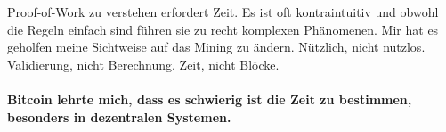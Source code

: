 Proof-of-Work zu verstehen erfordert Zeit. Es ist oft kontraintuitiv und obwohl
die Regeln einfach sind führen sie zu recht komplexen Phänomenen. Mir hat es
geholfen meine Sichtweise auf das Mining zu ändern. Nützlich, nicht nutzlos.
Validierung, nicht Berechnung. Zeit, nicht Blöcke.

\paragraph{Bitcoin lehrte mich, dass es schwierig ist die Zeit zu bestimmen,
besonders in dezentralen Systemen.}

%
%
%
%
%
%
%
